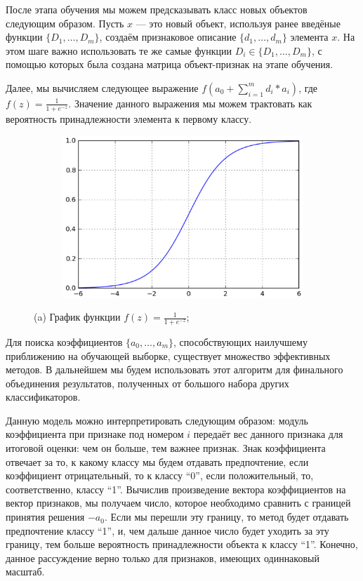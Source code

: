 После этапа обучения мы можем предсказывать класс новых объектов следующим образом. Пусть $x$ — это новый объект, используя ранее введёные функции $\{D_1, \dots, D_m \}$, создаём признаковое описание $\{d_1,…,d_m\}$ элемента $x$. На этом шаге важно использовать те же самые функции $D_i \in \{D_1, \dots, D_m \}$, с помощью которых была создана матрица объект-признак на этапе обучения.

Далее, мы вычисляем следующее выражение $ f \left( a_0 + \sum_{i=1}^{m} d_i * a_i \right)$, где $f \left( z \right) = \frac{1}{1 + e^{-z}}$. Значение данного выражения мы можем трактовать как вероятность принадлежности элемента к первому классу.

\begin{figure}[ht]
	\centering
    \begin{subfigure}[b]{1\textwidth}
    \centering
        \includegraphics[scale=0.5]{pasted-image-15.png}
        \caption{}
    \end{subfigure}
 
    \caption{(a) График функции $f \left( z \right) = \frac{1}{1 + e^{-z}}$;}
    \label{fig_parsetree}
\end{figure}

Для поиска коэффициентов $\{a_0,…,a_m\}$, способствующих наилучшему приближению на обучающей выборке, существует множество эффективных методов. В дальнейшем мы будем использовать этот алгоритм для финального объединения результатов, полученных от большого набора других классификаторов. 

Данную модель можно интерпретировать следующим образом: модуль коэффициента при признаке под номером $i$ передаёт вес данного признака для итоговой оценки: чем он больше, тем важнее признак. Знак коэффициента отвечает за то, к какому классу мы будем отдавать предпочтение, если коэффициент отрицательный, то к классу “0”, если положительный, то, соответственно, классу “1”. Вычислив произведение вектора коэффициентов на вектор признаков, мы получаем число, которое необходимо сравнить с границей принятия решения $-a_0$. Если мы перешли эту границу, то метод будет отдавать предпочтение классу “1”, и, чем дальше данное число будет уходить за эту границу, тем больше вероятность принадлежности объекта к классу “1”. Конечно, данное рассуждение верно только для признаков, имеющих одиннаковый масштаб.

